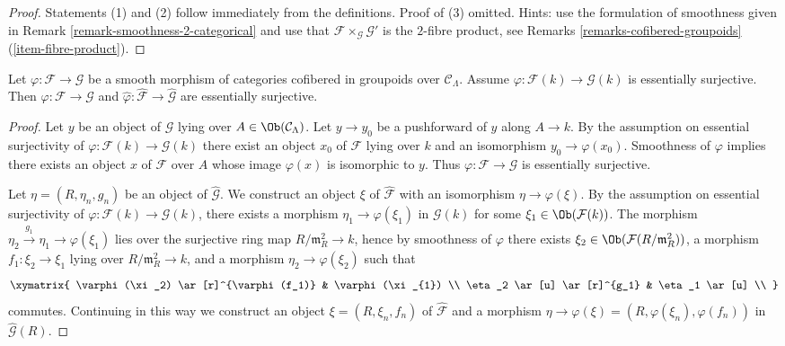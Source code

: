 \begin{proof}
Statements (1) and (2) follow immediately from the definitions.
Proof of (3) omitted. Hints: use the formulation of smoothness given in
Remark \ref{remark-smoothness-2-categorical}
and use that $\mathcal{F} \times_\mathcal{G} \mathcal{G}'$
is the $2$-fibre product, see
Remarks \ref{remarks-cofibered-groupoids} (\ref{item-fibre-product}).
\end{proof}

\begin{lemma}
\label{lemma-smooth-morphism-essentially-surjective}
Let $\varphi : \mathcal{F} \to \mathcal{G}$ be a smooth morphism of
categories cofibered in groupoids over $\mathcal{C}_\Lambda$.  Assume
$\varphi : \mathcal{F}(k) \to \mathcal{G}(k)$ is essentially surjective.
Then $\varphi : \mathcal{F} \to \mathcal{G}$ and
$\widehat{\varphi} : \widehat{\mathcal{F}} \to \widehat{\mathcal{G}}$
are essentially surjective.
\end{lemma}

\begin{proof}
Let $y$ be an object of $\mathcal{G}$ lying over
$A \in \Ob(\mathcal{C}_\Lambda)$. Let $y \to y_0$ be a pushforward
of $y$ along $A \to k$. By the assumption on essential surjectivity of
$\varphi : \mathcal{F}(k) \to \mathcal{G}(k)$ there exist an object
$x_0$ of $\mathcal{F}$ lying over $k$ and an isomorphism
$y_0 \to \varphi(x_0)$. Smoothness of $\varphi$ implies there exists
an object $x$ of $\mathcal{F}$ over $A$ whose image $\varphi(x)$
is isomorphic to $y$. Thus $\varphi : \mathcal{F} \to \mathcal{G}$
is essentially surjective.

\medskip\noindent
Let $\eta = (R, \eta_n, g_n)$ be an object of $\widehat{\mathcal{G}}$.  We
construct an object $\xi$ of $\widehat{\mathcal{F}}$ with an isomorphism
$\eta \to \varphi(\xi)$. By the assumption on essential surjectivity of
$\varphi : \mathcal{F}(k) \to \mathcal{G}(k)$, there exists a morphism
$\eta_1 \to \varphi(\xi_1)$ in $\mathcal{G}(k)$ for some
$\xi_1 \in \Ob(\mathcal{F}(k))$. The morphism
$\eta_2 \xrightarrow{g_1} \eta_1 \to \varphi(\xi_1)$
lies over the surjective ring map $R/\mathfrak m_R^2 \to k$, hence
by smoothness of $\varphi$ there exists
$\xi_2 \in \Ob(\mathcal{F}(R/\mathfrak m_R^2))$, a
morphism $f_1: \xi_2 \to \xi_1$ lying over
$R/\mathfrak m_R^2 \to k$, and a morphism
$\eta_2 \to \varphi(\xi_2)$ such that
$$
\xymatrix{
\varphi(\xi_2)  \ar[r]^{\varphi(f_1)} &  \varphi(\xi_{1})   \\
\eta_2   \ar[u] \ar[r]^{g_1}  & \eta_1  \ar[u] \\
}
$$
commutes. Continuing in this way we construct an object
$\xi = (R, \xi_n, f_n)$ of $\widehat{\mathcal{F}}$ and a morphism
$\eta \to \varphi(\xi) = (R, \varphi(\xi_n), \varphi(f_n))$
in $\widehat{\mathcal{G}}(R)$.
\end{proof}

